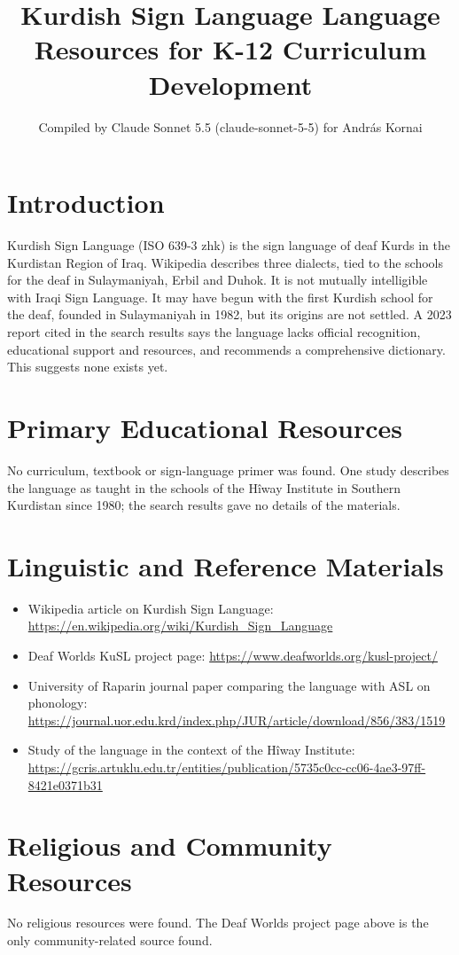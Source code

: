 \documentclass[12pt]{article}
\title{Kurdish Sign Language Language Resources for K-12 Curriculum Development}
\author{Compiled by Claude Sonnet 5.5 (claude-sonnet-5-5) for Andr\'as Kornai}
\date{}
\begin{document}
\maketitle

\section{Introduction}
Kurdish Sign Language (ISO 639-3 zhk) is the sign language of deaf Kurds in the Kurdistan Region of Iraq. Wikipedia describes three dialects, tied to the schools for the deaf in Sulaymaniyah, Erbil and Duhok. It is not mutually intelligible with Iraqi Sign Language. It may have begun with the first Kurdish school for the deaf, founded in Sulaymaniyah in 1982, but its origins are not settled. A 2023 report cited in the search results says the language lacks official recognition, educational support and resources, and recommends a comprehensive dictionary. This suggests none exists yet.

\section{Primary Educational Resources}
No curriculum, textbook or sign-language primer was found. One study describes the language as taught in the schools of the H\^iway Institute in Southern Kurdistan since 1980; the search results gave no details of the materials.

\section{Linguistic and Reference Materials}
\begin{itemize}
\item Wikipedia article on Kurdish Sign Language: \url{https://en.wikipedia.org/wiki/Kurdish_Sign_Language}
\item Deaf Worlds KuSL project page: \url{https://www.deafworlds.org/kusl-project/}
\item University of Raparin journal paper comparing the language with ASL on phonology: \url{https://journal.uor.edu.krd/index.php/JUR/article/download/856/383/1519}
\item Study of the language in the context of the H\^iway Institute: \url{https://gcris.artuklu.edu.tr/entities/publication/5735c0cc-cc06-4ae3-97ff-8421e0371b31}
\end{itemize}

\section{Religious and Community Resources}
No religious resources were found. The Deaf Worlds project page above is the only community-related source found.
\end{document}
